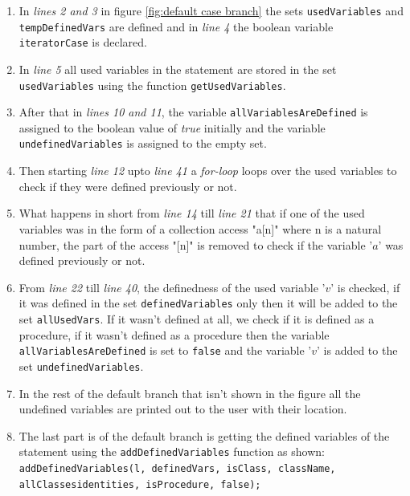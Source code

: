 \documentclass[11pt]{report}
\begin{document}
\begin{enumerate}
\item In \textsl{lines 2 and 3} in figure \ref{fig:default case branch} the sets \texttt{usedVariables} and \texttt{tempDefinedVars} are defined and in \textsl{line 4} the boolean variable \texttt{iteratorCase} is declared.

\item In \textsl{line 5} all used variables in the statement are stored in the set \texttt{usedVariables} using the function \texttt{getUsedVariables}.

\item After that in \textsl{lines 10 and 11}, the variable \texttt{allVariablesAreDefined} is assigned to the boolean value of \textsl{true} initially and the variable \texttt{undefinedVariables} is assigned to the empty set.

\item Then starting \textsl{line 12} upto \textsl{line 41} a \textsl{for-loop} loops over the used variables to check if they were defined previously or not.

\item What happens in short from \textsl{line 14} till \textsl{line 21} that if one of the used variables was in the form of a collection access "a[n]" where n is a natural number, the part of the access "[n]" is removed to check if the variable '$a$' was defined previously or not.

\item From \textsl{line 22} till \textsl{line 40}, the definedness of the used variable '$v$' is checked, if it was defined in the set \texttt{definedVariables} only then it will be added to the set \texttt{allUsedVars}. If it wasn't defined at all, we check if it is defined as a procedure, if it wasn't defined as a procedure then the variable \texttt{allVariablesAreDefined} is set to \texttt{false} and the variable '$v$' is added to the set \texttt{undefinedVariables}.

\item In the rest of the default branch that isn't shown in the figure all the undefined variables are printed out to the user with their location.

\item The last part is of the default branch is getting the defined variables of the statement using the \texttt{addDefinedVariables} function as shown:
\\[0.2cm]
\hspace*{0.6cm}
\texttt{addDefinedVariables(l, definedVars, isClass, className,}
\\ 
\hspace*{4.7cm}	
	\texttt{allClassesidentities, isProcedure, false);}
\\
\end{enumerate}
\end{document}
